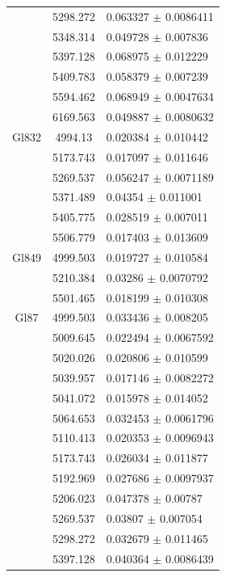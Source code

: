 \begin{longtable}{|c|c|l|}
 & 5298.272 & 0.063327 $\pm$ 0.0086411 \\       
 & 5348.314 & 0.049728 $\pm$ 0.007836 \\        
 & 5397.128 & 0.068975 $\pm$ 0.012229 \\        
 & 5409.783 & 0.058379 $\pm$ 0.007239 \\        
 & 5594.462 & 0.068949 $\pm$ 0.0047634 \\       
 & 6169.563 & 0.049887 $\pm$ 0.0080632 \\       
\hline                                          
Gl832 & 4994.13 & 0.020384 $\pm$ 0.010442 \\    
 & 5173.743 & 0.017097 $\pm$ 0.011646 \\        
 & 5269.537 & 0.056247 $\pm$ 0.0071189 \\       
 & 5371.489 & 0.04354 $\pm$ 0.011001 \\         
 & 5405.775 & 0.028519 $\pm$ 0.007011 \\        
 & 5506.779 & 0.017403 $\pm$ 0.013609 \\        
\hline                                          
Gl849 & 4999.503 & 0.019727 $\pm$ 0.010584 \\   
 & 5210.384 & 0.03286 $\pm$ 0.0070792 \\        
 & 5501.465 & 0.018199 $\pm$ 0.010308 \\        
\hline                                          
Gl87 & 4999.503 & 0.033436 $\pm$ 0.008205 \\    
 & 5009.645 & 0.022494 $\pm$ 0.0067592 \\       
 & 5020.026 & 0.020806 $\pm$ 0.010599 \\        
 & 5039.957 & 0.017146 $\pm$ 0.0082272 \\       
 & 5041.072 & 0.015978 $\pm$ 0.014052 \\        
 & 5064.653 & 0.032453 $\pm$ 0.0061796 \\       
 & 5110.413 & 0.020353 $\pm$ 0.0096943 \\       
 & 5173.743 & 0.026034 $\pm$ 0.011877 \\        
 & 5192.969 & 0.027686 $\pm$ 0.0097937 \\       
 & 5206.023 & 0.047378 $\pm$ 0.00787 \\         
 & 5269.537 & 0.03807 $\pm$ 0.007054 \\         
 & 5298.272 & 0.032679 $\pm$ 0.011465 \\        
 & 5397.128 & 0.040364 $\pm$ 0.0086439 \\       

\end{longtable}
